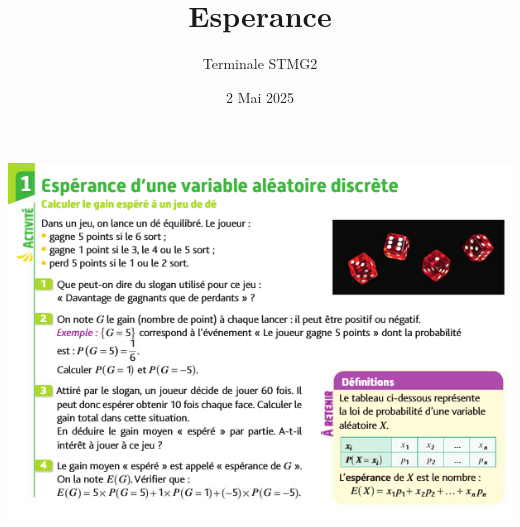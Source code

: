 \documentclass{article}
\title{Esperance}
\date{2 Mai 2025}
\author{Terminale STMG2}
\begin{document}
\maketitle
\begin{center}
\includegraphics[width=\textwidth]{Activite_Esperance.png}
\end{center}
\end{document}
